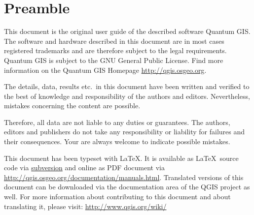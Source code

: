 
\newcommand\qgistip[1]{\raggedright\small{#1}}
\renewcommand{\topfraction}{0.85}
\renewcommand{\textfraction}{0.1}
\renewcommand{\floatpagefraction}{0.75}

\thispagestyle{empty}


\section*{Preamble}


This document is the original user guide of the described 
software Quantum GIS. The software and hardware described in this 
document are in most cases registered trademarks and are therefore subject 
to the legal requirements. Quantum GIS is subject to the GNU General Public 
License. Find more information on the Quantum GIS Homepage
\url{http://qgis.osgeo.org}.

The details, data, results etc.~in this document have been 
written and verified to the best of knowledge and responsibility of the 
authors and editors. Nevertheless, mistakes concerning the content are possible.

Therefore, all data are not liable to any duties or guarantees. The authors, editors 
and publishers do not take any responsibility or liability for failures and 
their consequences. Your are always welcome to indicate possible mistakes.

This document has been typeset with \LaTeX. It is available as \LaTeX~source
code via \href{http://wiki.qgis.org/qgiswiki/DocumentationWritersCorner}{subversion} 
and online as PDF document via \url{http://qgis.osgeo.org/documentation/manuals.html}. 
Translated versions of this document can be downloaded via the documentation 
area of the QGIS project as well. For more information about contributing to
this document and about translating it, please visit: \url{http://www.qgis.org/wiki/} 

\vspace{0.5cm}

